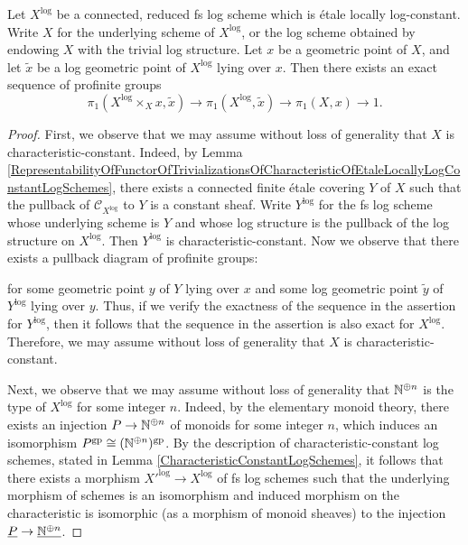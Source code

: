 \begin{thm}\label{ExactSequenceOfLogFundamentalGroupsOfEtaleLocallyLogConstantLogSchemes}
  Let $X^\log$ be a connected, reduced fs log scheme which is \'{e}tale locally log-constant. Write $X$ for the underlying scheme of $X^\log$, or the log scheme obtained by endowing $X$ with the trivial log structure. Let $x$ be a geometric point of $X$, and let $\tilde{x}$ be a log geometric point of $X^\log$ lying over $x$. Then there exists an exact sequence of profinite groups
  \[
    \pi_1(X^\log \times_X x, \tilde{x}) \to \pi_1(X^\log, \tilde{x}) \to \pi_1(X, x) \to 1.
  \]
\end{thm}
\begin{proof}
  First, we observe that we may assume without loss of generality that $X$ is characteristic-constant. Indeed, by Lemma \ref{RepresentabilityOfFunctorOfTrivializationsOfCharacteristicOfEtaleLocallyLogConstantLogSchemes}, there exists a connected finite \'{e}tale covering $Y$ of $X$ such that the pullback of $\mathcal{C}_{X^\log}$ to $Y$ is a constant sheaf. Write $Y^\log$ for the fs log scheme whose underlying scheme is $Y$ and whose log structure is the pullback of the log structure on $X^\log$. Then $Y^\log$ is characteristic-constant. Now we observe that there exists a pullback diagram of profinite groups:
  \begin{center}
  \end{center}
  for some geometric point $y$ of $Y$ lying over $x$ and some log geometric point $\tilde{y}$ of $Y^\log$ lying over $y$. Thus, if we verify the exactness of the sequence in the assertion for $Y^\log$, then it follows that the sequence in the assertion is also exact for $X^\log$. Therefore, we may assume without loss of generality that $X$ is characteristic-constant.

  Next, we observe that we may assume without loss of generality that $\mathbb{N}^{\oplus n}$ is the type of $X^\log$ for some integer $n$. Indeed, by the elementary monoid theory, there exists an injection $P \to \mathbb{N}^{\oplus n}$ of monoids for some integer $n$, which induces an isomorphism $P^{\mathrm{gp}} \cong (\mathbb{N}^{\oplus n})^{\mathrm{gp}}$. By the description of characteristic-constant log schemes, stated in Lemma \ref{CharacteristicConstantLogSchemes}, it follows that there exists a morphism $X'^\log \to X^\log$ of fs log schemes such that the underlying morphism of schemes is an isomorphism and induced morphism on the characteristic is isomorphic (as a morphism of monoid sheaves) to the injection $\underline{P} \to \underline{\mathbb{N}^{\oplus n}}$.


\end{proof}
